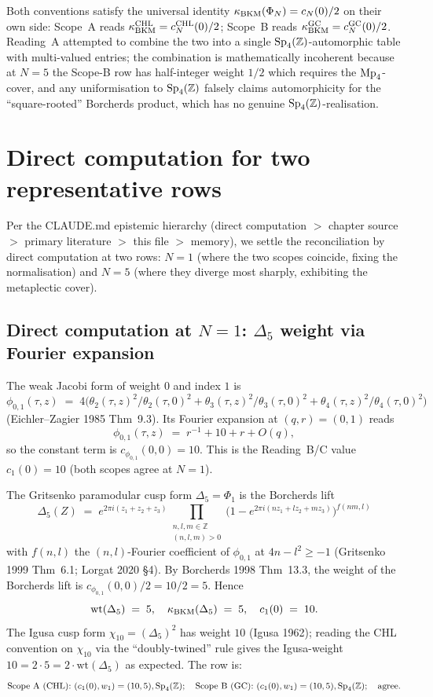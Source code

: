 Both conventions satisfy the universal identity $\kappa_{\mathrm{BKM}}(\Phi_N) =
c_N(0)/2$ on their own side: Scope~A reads $\kappa_{\mathrm{BKM}}^{\mathrm{CHL}} =
c_N^{\mathrm{CHL}}(0)/2$; Scope~B reads $\kappa_{\mathrm{BKM}}^{\mathrm{GC}} =
c_N^{\mathrm{GC}}(0)/2$. Reading~A attempted to combine the two into a
single $\mathrm{Sp}_4(\mathbb Z)$-automorphic table with multi-valued entries; the
combination is mathematically incoherent because at $N = 5$ the
Scope-B row has half-integer weight $1/2$ which requires the
$\mathrm{Mp}_4$-cover, and any uniformisation to $\mathrm{Sp}_4(\mathbb Z)$ falsely claims
automorphicity for the ``square-rooted'' Borcherds product, which has
no genuine $\mathrm{Sp}_4(\mathbb Z)$-realisation.

\section*{Direct computation for two representative rows}

Per the CLAUDE.md epistemic hierarchy (direct computation $>$ chapter
source $>$ primary literature $>$ this file $>$ memory), we settle the
reconciliation by direct computation at two rows: $N = 1$ (where the
two scopes coincide, fixing the normalisation) and $N = 5$ (where they
diverge most sharply, exhibiting the metaplectic cover).

\subsection*{Direct computation at $N = 1$: $\Delta_5$ weight via Fourier expansion}

The weak Jacobi form of weight $0$ and index $1$ is
\[
 \phi_{0, 1}(\tau, z) \;=\;
   4 \bigl(
     \theta_2(\tau, z)^2 / \theta_2(\tau, 0)^2
     + \theta_3(\tau, z)^2 / \theta_3(\tau, 0)^2
     + \theta_4(\tau, z)^2 / \theta_4(\tau, 0)^2
   \bigr)
\]
(Eichler--Zagier 1985 Thm~9.3). Its Fourier expansion at $(q, r) =
(0, 1)$ reads
\[
 \phi_{0, 1}(\tau, z) \;=\; r^{-1} + 10 + r + O(q),
\]
so the constant term is $c_{\phi_{0, 1}}(0, 0) = 10$. This is the
Reading~B/C value $c_1(0) = 10$ (both scopes agree at $N = 1$).

The Gritsenko paramodular cusp form $\Delta_5 = \Phi_1$ is the
Borcherds lift
\[
 \Delta_5(Z) \;=\;
 e^{2 \pi i (z_1 + z_2 + z_3)}
 \prod_{\substack{n, l, m \in \mathbb Z \\ (n, l, m) > 0}}
   \bigl( 1 - e^{2 \pi i (n z_1 + l z_2 + m z_3)}\bigr)^{f(n m, l)}
\]
with $f(n, l)$ the $(n, l)$-Fourier coefficient of $\phi_{0, 1}$ at
$4 n - l^2 \geq -1$ (Gritsenko 1999 Thm~6.1; Lorgat 2020 \S 4). By
Borcherds 1998 Thm~13.3, the weight of the Borcherds lift is
$c_{\phi_{0, 1}}(0, 0)/2 = 10/2 = 5$. Hence
\[
 \mathrm{wt}(\Delta_5) \;=\; 5, \quad \kappa_{\mathrm{BKM}}(\Delta_5) \;=\; 5,
 \quad c_1(0) \;=\; 10.
\]
The Igusa cusp form $\chi_{10} = (\Delta_5)^2$ has weight $10$ (Igusa
1962); reading the CHL convention on $\chi_{10}$ via the ``doubly-twined''
rule gives the Igusa-weight $10 = 2 \cdot 5 = 2 \cdot \mathrm{wt}
(\Delta_5)$ as expected. The row is:
\[
 \text{Scope~A (CHL):}\ (c_1(0), w_1) = (10, 5), \mathrm{Sp}_4(\mathbb Z); \quad
 \text{Scope~B (GC):}\ (c_1(0), w_1) = (10, 5), \mathrm{Sp}_4(\mathbb Z); \quad
 \text{agree}.
\]

